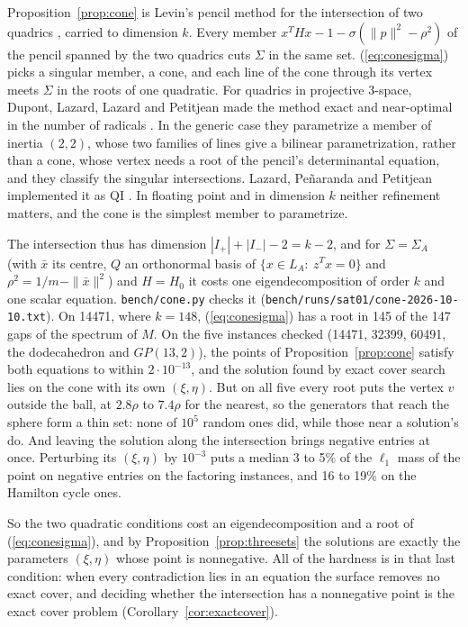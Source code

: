 \documentclass[11pt]{article}
\theoremstyle{definition}
\theoremstyle{remark}
\begin{document}
Proposition~\ref{prop:cone} is Levin's pencil method for the intersection of
two quadrics \cite{Le76}, carried to dimension $k$. Every member
$x^THx-1-\sigma(\|p\|^2-\rho^2)$ of the pencil spanned by the two quadrics
cuts $\Sigma$ in the same set. (\ref{eq:conesigma}) picks a singular member,
a cone, and each line of the cone through its vertex meets $\Sigma$ in the
roots of one quadratic. For quadrics in projective 3-space, Dupont, Lazard,
Lazard and Petitjean made the method exact and near-optimal in the number of
radicals \cite{DLLP08}. In the generic case they parametrize a member of
inertia $(2,2)$, whose two families of lines give a bilinear
parametrization, rather than a cone, whose vertex needs a root of the
pencil's determinantal equation, and they classify the singular
intersections. Lazard, Pe\~naranda and Petitjean implemented it as QI
\cite{LPP06}. In floating point and in dimension $k$ neither refinement
matters, and the cone is the simplest member to parametrize.

The intersection thus has dimension $|I_+|+|I_-|-2=k-2$, and for
$\Sigma=\Sigma_A$ (with $\bar x$ its centre, $Q$ an orthonormal basis of
$\{x\in L_A:\ z^Tx=0\}$ and $\rho^2=1/m-\|\bar x\|^2$) and $H=H_0$ it costs
one eigendecomposition of order $k$ and one scalar equation.
\texttt{bench/cone.py} checks it (\texttt{bench/runs/sat01/cone-2026-10-10.txt}).
On 14471, where $k=148$, (\ref{eq:conesigma}) has a root in 145 of the 147
gaps of the spectrum of $M$. On the five instances checked (14471, 32399,
60491, the dodecahedron and $GP(13,2)$), the points of
Proposition~\ref{prop:cone} satisfy both equations to within
$2\cdot10^{-13}$, and the solution found by exact cover search lies on the
cone with its own $(\xi,\eta)$. But on all five every root puts the vertex
$v$ outside the ball, at $2.8\rho$ to $7.4\rho$ for the nearest, so the
generators that reach the sphere form a thin set: none of $10^5$ random ones
did, while those near a solution's do. And leaving the solution along the
intersection brings negative entries at once. Perturbing its $(\xi,\eta)$ by
$10^{-3}$ puts a median 3 to 5\% of the $\ell_1$ mass of the point on
negative entries on the factoring instances, and 16 to 19\% on the Hamilton
cycle ones.

So the two quadratic conditions cost an eigendecomposition and a root of
(\ref{eq:conesigma}), and by Proposition~\ref{prop:threesets} the solutions
are exactly the parameters $(\xi,\eta)$ whose point is nonnegative. All of
the hardness is in that last condition: when every contradiction lies in an
equation the surface removes no exact cover, and deciding whether the
intersection has a nonnegative point is the exact cover problem
(Corollary~\ref{cor:exactcover}).
\end{document}
